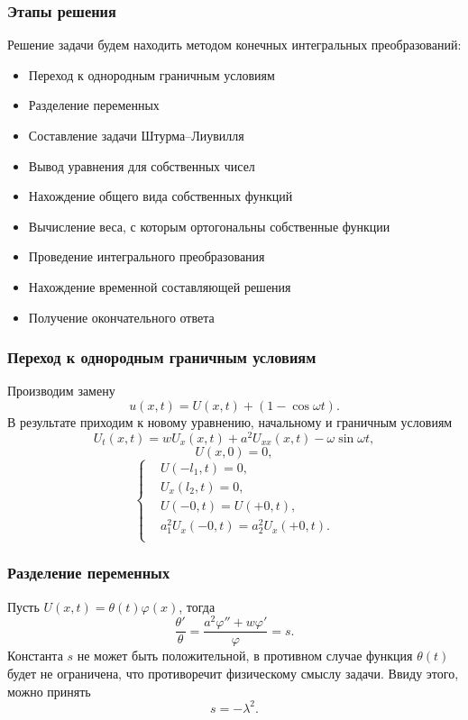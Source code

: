 \documentclass[10pt,pdf,hyperref={unicode}]{beamer}
\begin{document}
\begin{frame}
  \frametitle{Этапы решения}
  Решение задачи будем находить методом конечных интегральных преобразований:
  \begin{itemize}
    \item Переход к однородным граничным условиям
    \item Разделение переменных
    \item Составление задачи Штурма--Лиувилля
    \item Вывод уравнения для собственных чисел
    \item Нахождение общего вида собственных функций
    \item Вычисление веса, с которым ортогональны собственные функции
    \item Проведение интегрального преобразования
    \item Нахождение временной составляющей решения
    \item Получение окончательного ответа
  \end{itemize}
\end{frame}

\begin{frame}
  \frametitle{Переход к однородным граничным условиям} 
  Производим замену
  \begin{equation*}
    u(x,t) = U(x,t) + (1 - \cos \omega t).
  \end{equation*}
  В результате приходим к новому уравнению, начальному и граничным условиям
  \begin{equation*}
    U_t(x,t) = w U_x(x,t) + a^2 U_{xx}(x,t) - \omega\sin\omega t,
  \end{equation*}
  \begin{equation*}
    U(x,0) = 0,
  \end{equation*}
  \begin{equation*}
    \left\{
    \begin{aligned}
      & U(-l_1,t) = 0, \\
      & U_x(l_2,t) = 0, \\
      & U(-0, t) = U(+0, t), \\
      & a_1^2 U_{x}(-0, t) = a_2^2 U_{x}(+0, t). \\
    \end{aligned}
    \right.
  \end{equation*}
\end{frame}

\begin{frame}
  \frametitle{Разделение переменных}
  Пусть $ U(x,t)=\theta(t)\varphi(x) $, тогда
  \begin{equation*}
    \frac{\theta'}{\theta}=\frac{a^2\varphi''+w\varphi'}{\varphi}=s.
    \label{eq:1}
  \end{equation*}
  Константа $ s $ не может быть положительной, в противном случае функция $\theta(t)$ будет не ограничена, что противоречит физическому смыслу задачи. Ввиду этого, можно принять
  \begin{equation*}
    s=-\lambda^2.
    \label{eq:2}
  \end{equation*}
\end{frame}
\end{document}
